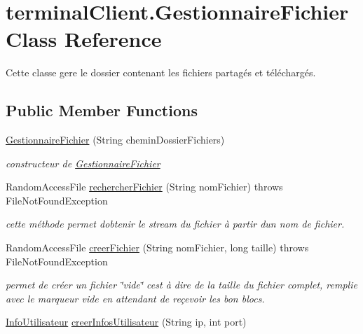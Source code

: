 \hypertarget{classterminalClient_1_1GestionnaireFichier}{}\section{terminal\+Client.\+Gestionnaire\+Fichier Class Reference}
\label{classterminalClient_1_1GestionnaireFichier}


Cette classe gere le dossier contenant les fichiers partagés et téléchargés.  


\subsection*{Public Member Functions}
\begin{DoxyCompactItemize}
\item 
\hyperlink{classterminalClient_1_1GestionnaireFichier_a058b107e8ee834b30e0a86f238afc852}{Gestionnaire\+Fichier} (String chemin\+Dossier\+Fichiers)
\begin{DoxyCompactList}\small\item\em constructeur de \hyperlink{classterminalClient_1_1GestionnaireFichier}{Gestionnaire\+Fichier} \end{DoxyCompactList}\item 
Random\+Access\+File \hyperlink{classterminalClient_1_1GestionnaireFichier_ae1ecacc9776836d965a472406f4e9584}{rechercher\+Fichier} (String nom\+Fichier)  throws File\+Not\+Found\+Exception 
\begin{DoxyCompactList}\small\item\em cette méthode permet d\textquotesingle{}obtenir le stream du fichier à partir d\textquotesingle{}un nom de fichier. \end{DoxyCompactList}\item 
Random\+Access\+File \hyperlink{classterminalClient_1_1GestionnaireFichier_a81c7f37ddcde7593ad44cc46063e83c9}{creer\+Fichier} (String nom\+Fichier, long taille)  throws File\+Not\+Found\+Exception 
\begin{DoxyCompactList}\small\item\em permet de créer un fichier \char`\"{}vide\char`\"{} c\textquotesingle{}est à dire de la taille du fichier complet, remplie avec le marqueur vide en attendant de reçevoir les bon blocs. \end{DoxyCompactList}\item 
\hyperlink{classcommun_1_1InfoUtilisateur}{Info\+Utilisateur} \hyperlink{classterminalClient_1_1GestionnaireFichier_aec0fe5bdafe5e9e65961e200744ea082}{creer\+Infos\+Utilisateur} (String ip, int port)

\end{DoxyCompactItemize}
